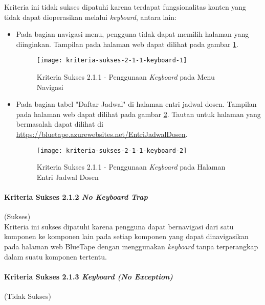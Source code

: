 Kriteria ini tidak sukses dipatuhi karena terdapat fungsionalitas konten yang tidak dapat dioperasikan melalui \textit{keyboard}, antara lain:

\begin{itemize}
    \item Pada bagian navigasi menu, pengguna tidak dapat memilih halaman yang diinginkan. Tampilan pada halaman web dapat dilihat pada gambar \ref{fig:2.1.1_keyboard_1}.
    \begin{figure}[H]
        \centering  
        \texttt{[image: kriteria-sukses-2-1-1-keyboard-1]}  
        \caption[Kriteria Sukses 2.1.1 - Penggunaan \textit{Keyboard} pada Menu Navigasi]{Kriteria Sukses 2.1.1 - Penggunaan \textit{Keyboard} pada Menu Navigasi}
        \label{fig:2.1.1_keyboard_1}  
    \end{figure} 

    \item Pada bagian tabel "Daftar Jadwal" di halaman entri jadwal dosen. Tampilan pada halaman web dapat dilihat pada gambar \ref{fig:2.1.1_keyboard_2}. Tautan untuk halaman yang bermasalah dapat dilihat di \url{https://bluetape.azurewebsites.net/EntriJadwalDosen}.
    \begin{figure}[H]
        \centering  
        \texttt{[image: kriteria-sukses-2-1-1-keyboard-2]}  
        \caption[Kriteria Sukses 2.1.1 - Penggunaan \textit{Keyboard} pada Halaman Entri Jadwal Dosen]{Kriteria Sukses 2.1.1 - Penggunaan \textit{Keyboard} pada Halaman Entri Jadwal Dosen}
        \label{fig:2.1.1_keyboard_2}  
    \end{figure} 
\end{itemize}

\paragraph{Kriteria Sukses 2.1.2 \textit{No Keyboard Trap}}
\label{par:kepatuhan_bluetape_kriteria_sukses_2.1.2}
(Sukses)\\

Kriteria ini sukses dipatuhi karena pengguna dapat bernavigasi dari satu komponen ke komponen lain pada setiap komponen yang dapat dinavigasikan pada halaman web BlueTape dengan menggunakan \textit{keyboard} tanpa terperangkap dalam suatu komponen tertentu.

\paragraph{Kriteria Sukses 2.1.3 \textit{Keyboard (No Exception)}}
\label{par:kepatuhan_bluetape_kriteria_sukses_2.1.3}
(Tidak Sukses)\\

